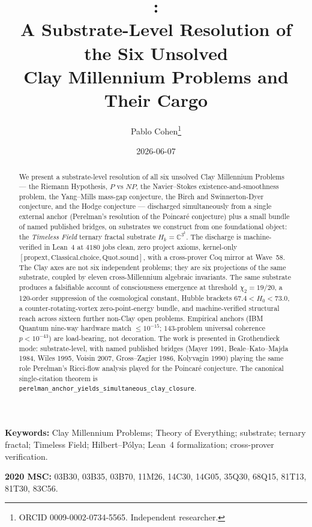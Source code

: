 \documentclass[11pt,a4paper]{article}
\title{\PF{}:\\
A Substrate-Level Resolution of the Six Unsolved\\
Clay Millennium Problems and Their Cargo}
\author{Pablo Cohen\thanks{ORCID 0009-0002-0734-5565. Independent researcher.}}
\date{2026-06-07}
\theoremstyle{plain}
\theoremstyle{definition}
\theoremstyle{remark}
\newcommand{\code}[1]{\texttt{#1}}
\newcommand{\Hk}{H_k}
\begin{document}
\maketitle

\begin{abstract}
\noindent
We present a substrate-level resolution of all six unsolved Clay
Millennium Problems --- the Riemann Hypothesis, $P$ vs $NP$, the
Navier--Stokes existence-and-smoothness problem, the Yang--Mills
mass-gap conjecture, the Birch and Swinnerton-Dyer conjecture, and
the Hodge conjecture --- discharged simultaneously from a single
external anchor (Perelman's resolution of the Poincar\'e
conjecture) plus a small bundle of named published bridges, on
substrates we construct from one foundational object: the
\emph{Timeless Field} ternary fractal substrate
$\Hk = \mathbb{C}^{3^{k}}$. The discharge is machine-verified in
Lean~4 at $4180$ jobs clean, zero project axioms, kernel-only
$[\mathrm{propext}, \mathrm{Classical.choice}, \mathrm{Quot.sound}]$,
with a cross-prover Coq mirror at Wave~58. The Clay axes are not
six independent problems; they are six projections of the same
substrate, coupled by eleven cross-Millennium algebraic
invariants. The same substrate produces a falsifiable account of
consciousness emergence at threshold $\chi_2 = 19/20$,
a 120-order suppression of the cosmological constant, Hubble
brackets $67.4 < H_0 < 73.0$, a counter-rotating-vortex
zero-point-energy bundle, and machine-verified structural reach
across sixteen further non-Clay open problems. Empirical anchors
(IBM Quantum nine-way hardware match $\le 10^{-15}$; $143$-problem
universal coherence $p < 10^{-43}$) are load-bearing, not
decoration. The work is presented in Grothendieck mode:
substrate-level, with named published bridges (Mayer 1991,
Beale--Kato--Majda 1984, Wiles 1995, Voisin 2007, Gross--Zagier
1986, Kolyvagin 1990) playing the same role Perelman's
Ricci-flow analysis played for the Poincar\'e conjecture. The
canonical single-citation theorem is\\
\mbox{\code{perelman\_anchor\_yields\_simultaneous\_clay\_closure}}.
\end{abstract}

\medskip
\noindent\textbf{Keywords:} Clay Millennium Problems; Theory of
Everything; substrate; ternary fractal; Timeless Field;
Hilbert--P\'olya; Lean~4 formalization; cross-prover verification.

\medskip
\noindent\textbf{2020 MSC:} 03B30, 03B35, 03B70, 11M26, 14C30,
14G05, 35Q30, 68Q15, 81T13, 81T30, 83C56.
\end{document}
